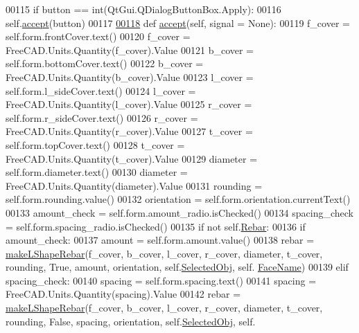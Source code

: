 \begin{DoxyCode}
00115         \textcolor{keywordflow}{if} button == int(QtGui.QDialogButtonBox.Apply):
00116             self.\hyperlink{classLShapeRebar_1_1__LShapeRebarTaskPanel_a4d62ad224c06875ec721ba9acbdea774}{accept}(button)
00117 
\hypertarget{LShapeRebar_8py_source.tex_l00118}{}\hyperlink{classLShapeRebar_1_1__LShapeRebarTaskPanel_a4d62ad224c06875ec721ba9acbdea774}{00118}     \textcolor{keyword}{def }\hyperlink{classLShapeRebar_1_1__LShapeRebarTaskPanel_a4d62ad224c06875ec721ba9acbdea774}{accept}(self, signal = None):
00119         f\_cover = self.form.frontCover.text()
00120         f\_cover = FreeCAD.Units.Quantity(f\_cover).Value
00121         b\_cover = self.form.bottomCover.text()
00122         b\_cover = FreeCAD.Units.Quantity(b\_cover).Value
00123         l\_cover = self.form.l\_sideCover.text()
00124         l\_cover = FreeCAD.Units.Quantity(l\_cover).Value
00125         r\_cover = self.form.r\_sideCover.text()
00126         r\_cover = FreeCAD.Units.Quantity(r\_cover).Value
00127         t\_cover = self.form.topCover.text()
00128         t\_cover = FreeCAD.Units.Quantity(t\_cover).Value
00129         diameter = self.form.diameter.text()
00130         diameter = FreeCAD.Units.Quantity(diameter).Value
00131         rounding = self.form.rounding.value()
00132         orientation = self.form.orientation.currentText()
00133         amount\_check = self.form.amount\_radio.isChecked()
00134         spacing\_check = self.form.spacing\_radio.isChecked()
00135         \textcolor{keywordflow}{if} \textcolor{keywordflow}{not} self.\hyperlink{classLShapeRebar_1_1__LShapeRebarTaskPanel_a4a64ebfb73de83fd42f3a349272e69c7}{Rebar}:
00136             \textcolor{keywordflow}{if} amount\_check:
00137                 amount = self.form.amount.value()
00138                 rebar = \hyperlink{namespaceLShapeRebar_a647a28e94933108c6617da8532d76998}{makeLShapeRebar}(f\_cover, b\_cover, l\_cover, r\_cover, diameter, 
      t\_cover, rounding, \textcolor{keyword}{True}, amount, orientation, self.\hyperlink{classLShapeRebar_1_1__LShapeRebarTaskPanel_a71f1ee825528164c18315a0234f6da5d}{SelectedObj}, self.
      \hyperlink{classLShapeRebar_1_1__LShapeRebarTaskPanel_a8f624818baf68844984b3368f27dc421}{FaceName})
00139             \textcolor{keywordflow}{elif} spacing\_check:
00140                 spacing = self.form.spacing.text()
00141                 spacing = FreeCAD.Units.Quantity(spacing).Value
00142                 rebar = \hyperlink{namespaceLShapeRebar_a647a28e94933108c6617da8532d76998}{makeLShapeRebar}(f\_cover, b\_cover, l\_cover, r\_cover, diameter, 
      t\_cover, rounding, \textcolor{keyword}{False}, spacing, orientation, self.\hyperlink{classLShapeRebar_1_1__LShapeRebarTaskPanel_a71f1ee825528164c18315a0234f6da5d}{SelectedObj}, self.

\end{DoxyCode}
